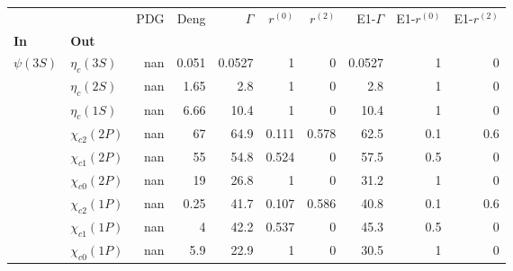 \begin{tabular}{l|l|r|r|r|r|r|r|r|r}
\toprule
           &                 &  PDG &  Deng &  $\Gamma$ &  $r^{(0)}$ &  $r^{(2)}$ &  E1-$\Gamma$ &  E1-$r^{(0)}$ &  E1-$r^{(2)}$ \\
\textbf{In} & \textbf{Out} &      &       &           &            &            &              &               &               \\
\midrule
\textbf{$\psi(3S)$} & \textbf{$\eta_{c}(3S)$} &  nan & 0.051 &    0.0527 &          1 &          0 &       0.0527 &             1 &             0 \\
           & \textbf{$\eta_{c}(2S)$} &  nan &  1.65 &       2.8 &          1 &          0 &          2.8 &             1 &             0 \\
           & \textbf{$\eta_{c}(1S)$} &  nan &  6.66 &      10.4 &          1 &          0 &         10.4 &             1 &             0 \\
           & \textbf{$\chi_{c2}(2P)$} &  nan &    67 &      64.9 &      0.111 &      0.578 &         62.5 &           0.1 &           0.6 \\
           & \textbf{$\chi_{c1}(2P)$} &  nan &    55 &      54.8 &      0.524 &          0 &         57.5 &           0.5 &             0 \\
           & \textbf{$\chi_{c0}(2P)$} &  nan &    19 &      26.8 &          1 &          0 &         31.2 &             1 &             0 \\
           & \textbf{$\chi_{c2}(1P)$} &  nan &  0.25 &      41.7 &      0.107 &      0.586 &         40.8 &           0.1 &           0.6 \\
           & \textbf{$\chi_{c1}(1P)$} &  nan &     4 &      42.2 &      0.537 &          0 &         45.3 &           0.5 &             0 \\
           & \textbf{$\chi_{c0}(1P)$} &  nan &   5.9 &      22.9 &          1 &          0 &         30.5 &             1 &             0 \\
\bottomrule
\end{tabular}
